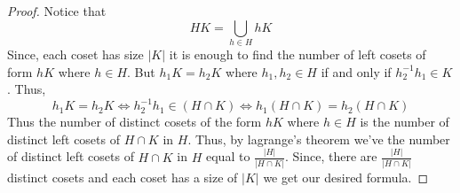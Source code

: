 \begin{proof}
    Notice that 
    \[ HK = \bigcup_{h \in H} hK \]
    Since, each coset has size $|K|$ it is enough to find the number of left cosets of form $hK$ where $h \in H$. But $h_1 K = h_2 K$ where
    $h_1,h_2 \in H$ if and only if $h_2^{-1}h_1 \in K$. Thus,
    \[ h_1 K = h_2 K \iff h_2^{-1}h_1 \in (H \cap K) \iff h_1 (H \cap K) = h_2 (H \cap K) \]
    Thus the number of distinct cosets of the form $hK$ where $h \in H$ is the number of distinct left cosets of $H \cap K$ in $H$.
    Thus, by lagrange's theorem we've the number of distinct left cosets of $H \cap K$ in $H$ equal to $\frac{|H|}{|H\cap K|}$.
    Since, there are $\frac{|H|}{|H\cap K|}$ distinct cosets and each coset has a size of $|K|$ we get our desired formula.
\end{proof}